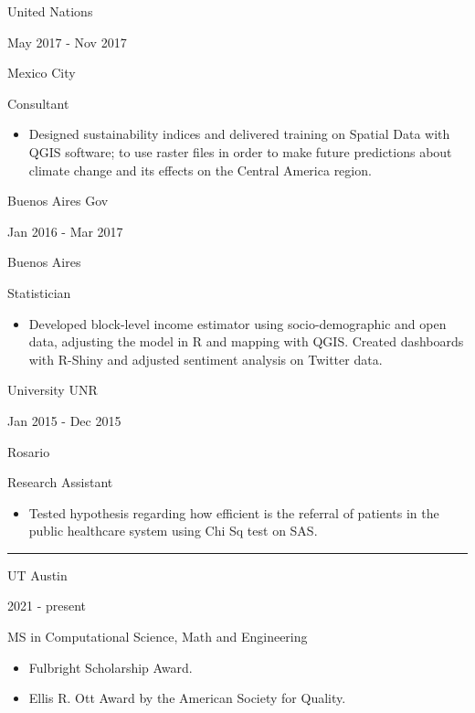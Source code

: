\documentclass[a4paper,10pt]{article}
\newlength{\cvcolumngapwidth}
\newlength{\cvleftcolumnwidth}
\newlength{\cvrightcolumnwidth}
\newcommand{\cvsectionstyle}[1]{{\normalsize\cvsectionfont\textcolor{cvsectioncolor}{#1}}}
\newcommand{\cvtitlestyle}[1]{{\large\cvtitlefont\textcolor{cvtitlecolor}{#1}}}
\newcommand{\cvdurationstyle}[1]{{\small\cvdurationfont\textcolor{cvdurationcolor}{#1}}}
\newcommand{\cvheadingstyle}[1]{{\normalsize\cvheadingfont\textcolor{cvheadingcolor}{#1}}}
\newlength{\cvafteritemskipamount}
\newlength{\cvaftersectionskipamount}
\newlength{\cvaftertitleskipamount}
\newlength{\cvparskip}
\newcommand{\cvsection}[1]{
    \begin{minipage}[t]{\cvleftcolumnwidth}
        \raggedleft\cvsectionstyle{#1}
    \end{minipage}%
    \hspace{\cvcolumngapwidth}%
    \begin{minipage}[t]{\cvrightcolumnwidth}
        \textcolor{cvrulecolor}{\rule{\cvrightcolumnwidth}{0.3mm}}
    \end{minipage}

    \vspace{\cvaftersectionskipamount}
}
\newcommand{\cvitem}[2]{
    \begin{minipage}[t]{\cvleftcolumnwidth}
        \raggedleft #1
    \end{minipage}%
    \hspace{\cvcolumngapwidth}%
    \begin{minipage}[t]{\cvrightcolumnwidth}
        \setlength{\parskip}{\cvparskip} #2
    \end{minipage}

    \vspace{\cvafteritemskipamount}
}
\newcommand{\cvtitle}[1]{
    \cvtitlestyle{#1}

    \vspace{\cvaftertitleskipamount}
    \vspace{-\cvparskip}
}
\begin{document}
\cvitem{
    \cvheadingstyle{United Nations}

    \cvdurationstyle{May 2017 - Nov 2017}

    \cvdurationstyle{Mexico City}


}{
    \cvtitle{Consultant}

    \begin{itemize}[leftmargin=*]
        \item Designed sustainability indices and delivered training on Spatial Data with QGIS software; to use raster files in order to make future predictions about climate change and its effects on the Central America region.
    \end{itemize}
}


\cvitem{
    \cvheadingstyle{Buenos Aires Gov}

    \cvdurationstyle{Jan 2016 - Mar 2017}

    \cvdurationstyle{Buenos Aires}

}{
    \cvtitle{Statistician}


    \begin{itemize}[leftmargin=*]
        \item Developed block-level income estimator using socio-demographic and open data, adjusting the model in R and mapping with QGIS. Created dashboards with R-Shiny and adjusted sentiment analysis on Twitter data.

    \end{itemize}
}


\cvitem{
    \cvheadingstyle{University UNR}

    \cvdurationstyle{Jan 2015 - Dec 2015}

    \cvdurationstyle{Rosario}




}{
    \cvtitle{Research Assistant }

      \begin{itemize}[leftmargin=*]
        \item Tested hypothesis regarding how efficient is the referral of patients in the public healthcare system using Chi Sq test on SAS.


    \end{itemize}


}



\cvsection{EDUCATION}

\cvitem{
    \cvheadingstyle{UT Austin}

    \cvdurationstyle{2021 - present}
}{
    \cvtitle{MS in Computational Science, Math and Engineering}

    \begin{itemize}[leftmargin=*]
        \item Fulbright Scholarship Award.
        \item Ellis R. Ott Award by the American Society for Quality.
    \end{itemize}
}
\end{document}
